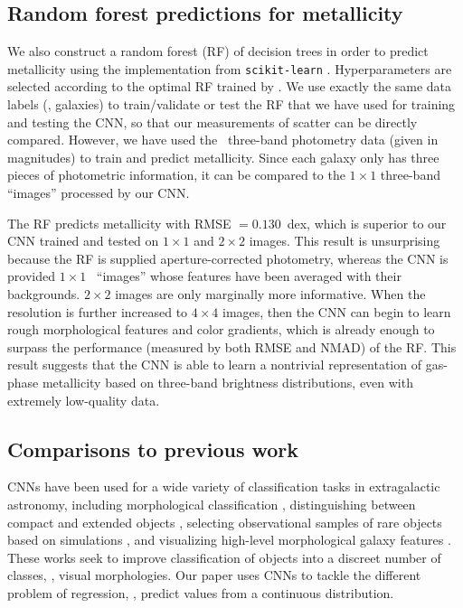 \documentclass[fleqn,usenatbib]{mnras}
\begin{document}
\subsection{Random forest predictions for metallicity}
We also construct a random forest (RF) of decision trees in order to predict metallicity using the implementation from \texttt{scikit-learn} \citep{Pedregosa2012}. Hyperparameters are selected according to the optimal RF trained by \cite{Acquaviva2016}. We use exactly the same data labels (\ie, galaxies) to train/validate or test the RF that we have used for training and testing the CNN, so that our measurements of scatter can be directly compared. However, we have used the \sdssg\sdssr\sdssi\ three-band photometry data (given in magnitudes) to train and predict metallicity. Since each galaxy only has three pieces of photometric information, it can be compared to the $1 \times 1$ three-band ``images'' processed by our CNN.

The RF predicts metallicity with RMSE $= 0.130$~dex, which is superior to our CNN trained and tested on $1\times 1$ and $2 \times 2$ images. This result is unsurprising because the RF is supplied aperture-corrected photometry, whereas the CNN is provided $1 \times 1 $ \sdssg\sdssr\sdssi\ ``images'' whose features have been averaged with their backgrounds. $2 \times 2$ images are only marginally more informative. When the resolution is further increased to $4 \times 4$ images, then the CNN can begin to learn rough morphological features and color gradients, which is already enough to surpass the performance (measured by both RMSE and NMAD) of the RF.
This result suggests that the CNN is able to learn a nontrivial representation of gas-phase metallicity based on three-band brightness distributions, even with extremely low-quality data.

\subsection{Comparisons to previous work}\label{sec:previous work}
CNNs have been used for a wide variety of classification tasks in extragalactic astronomy, including morphological classification , distinguishing between compact and extended objects \citep{Kim2017}, selecting observational samples of rare objects based on simulations \citep{Huertas-Company2018, Lanusse2017}, and visualizing high-level morphological galaxy features \citep{Dai2018}. These works seek to improve classification of objects into a discreet number of classes, \ie, visual morphologies. Our paper uses CNNs to tackle the different problem of regression, \ie, predict values from a continuous distribution.
\end{document}

